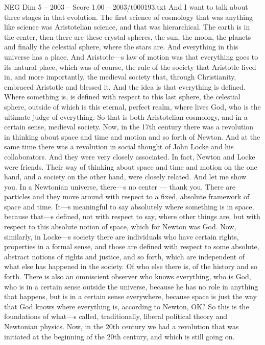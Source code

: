 \begin{textsample}{NEG Dim 5 – 2003 – Score 1.00 – 2003/t000193.txt}
And I want to talk about three stages in that evolution.
The first science of cosmology that was anything like science was Aristotelian science, and that was hierarchical.
The earth is in the center, then there are these crystal spheres, the sun, the moon, the planets and finally the celestial sphere, where the stars are.
And everything in this universe has a place.
And Aristotle—s law of motion was that everything goes to its natural place, which was of course, the rule of the society that Aristotle lived in, and more importantly, the medieval society that, through Christianity, embraced Aristotle and blessed it.
And the idea is that everything is defined.
Where something is, is defined with respect to this last sphere, the celestial sphere, outside of which is this eternal, perfect realm, where lives God, who is the ultimate judge of everything.
So that is both Aristotelian cosmology, and in a certain sense, medieval society.
Now, in the 17th century there was a revolution in thinking about space and time and motion and so forth of Newton.
And at the same time there was a revolution in social thought of John Locke and his collaborators.
And they were very closely associated.
In fact, Newton and Locke were friends.
Their way of thinking about space and time and motion on the one hand, and a society on the other hand, were closely related.
And let me show you.
In a Newtonian universe, there—s no center — thank you.
There are particles and they move around with respect to a fixed, absolute framework of space and time.
It—s meaningful to say absolutely where something is in space, because that—s defined, not with respect to say, where other things are, but with respect to this absolute notion of space, which for Newton was God.
Now, similarly, in Locke—s society there are individuals who have certain rights, properties in a formal sense, and those are defined with respect to some absolute, abstract notions of rights and justice, and so forth, which are independent of what else has happened in the society.
Of who else there is, of the history and so forth.
There is also an omniscient observer who knows everything, who is God, who is in a certain sense outside the universe, because he has no role in anything that happens, but is in a certain sense everywhere, because space is just the way that God knows where everything is, according to Newton, OK?
So this is the foundations of what—s called, traditionally, liberal political theory and Newtonian physics.
Now, in the 20th century we had a revolution that was initiated at the beginning of the 20th century, and which is still going on.

\end{textsample}
